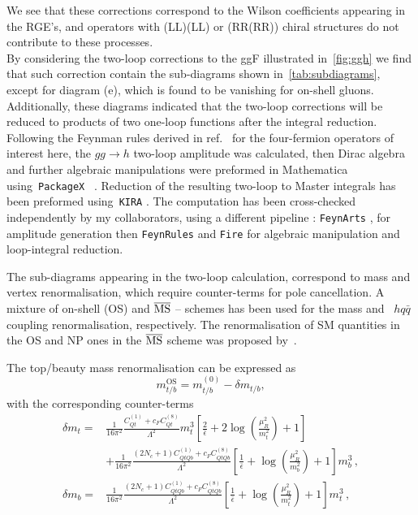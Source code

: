 \par We see that these corrections correspond to the Wilson coefficients appearing in the RGE's, and operators with (LL)(LL) or (RR(RR)) chiral structures do not contribute to these processes. \\ By considering the two-loop corrections to the ggF illustrated in~\autoref{fig:ggh} we find that such correction contain the sub-diagrams shown in~\autoref{tab:subdiagrams}, except for diagram (e), which is found to be vanishing for on-shell gluons. Additionally, these diagrams indicated that the two-loop corrections will be reduced to products of two one-loop functions after the integral reduction. \\
Following the Feynman rules derived in ref.~\cite{Dedes:2017zog} for the four-fermion operators of interest here, the $ gg \to h$ two-loop amplitude was calculated, then Dirac algebra and further algebraic manipulations were preformed in Mathematica using~\texttt{PackageX}~ \cite{Patel:2015tea}. Reduction of the resulting two-loop to Master integrals has been preformed using~\texttt{KIRA} \cite{Maierhoefer:2017hyi}. The computation has been cross-checked independently by my collaborators, using a different pipeline : \texttt{FeynArts} \cite{Hahn:2000kx}, for amplitude generation then  \texttt{FeynRules} \cite{Alloul:2013bka}  and  \texttt{Fire} \cite{Smirnov:2008iw} for algebraic manipulation and loop-integral reduction. \\
\par
The sub-diagrams appearing in the two-loop calculation, correspond to mass and vertex renormalisation, which require counter-terms for pole cancellation. A mixture of on-shell (OS) and $\overline{\mathrm{MS}}$ -- schemes has been used for the mass and ~$h q \bar{q}$ coupling renormalisation, respectively. The renormalisation of SM quantities in the OS and NP ones in the $\overline{\mathrm{MS}}$ scheme was proposed by~\cite{Dawson:2018pyl}.
	\par The top/beauty mass renormalisation can be expressed as  
	\begin{equation}
		m_{t/b}^{\text{OS}}=m_{t/b}^{(0)}-\delta m_{t/b},
	\end{equation}
with the corresponding counter-terms
\begin{align}
	\delta m_t =&\frac{1}{16 \pi^2} \frac{C_{Qt}^{(1)}+c_F C_{Qt}^{(8)}}{\Lambda^2}m_t^3\left[ \frac{2}{\bar{\epsilon}} +2 \log\left(\frac{\mu_R^2}{m_t^2}\right)+1\right] \\ &+ \frac{1}{16 \pi^2}  \frac{(2 N_c+1) C_{QtQb}^{(1)}+c_F C_{QtQb}^{(8)}}{\Lambda^2}  \left[ \frac{1}{\bar{\epsilon}} +  \log\left(\frac{\mu_R^2}{m_b^2}\right)+1 \right]  m_b^3\,, \nonumber \\
	\delta m_b=&\frac{1}{16 \pi^2} \frac{(2 N_c+1)C_{QtQb}^{(1)}+c_F C_{QtQb}^{(8)}}{\Lambda^2}\left[ \frac{1}{\bar{\epsilon}} +\log\left( \frac{\mu_R^2}{m_t^2}\right)+1\right] m_t^3\,,
\end{align}
